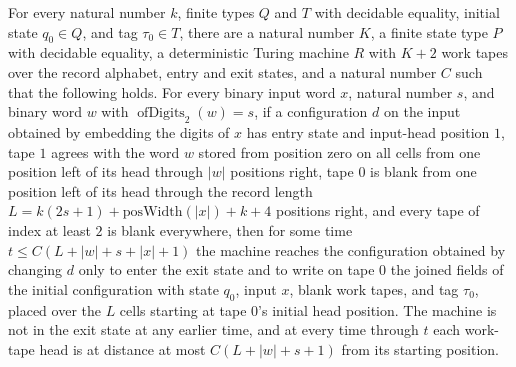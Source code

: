 \begin{theorem}
\label{Turing.exists_recordInitTM}
\leanok
{}
For every natural number $k$, finite types $Q$ and $T$ with decidable equality, initial
state $q_0\in Q$, and tag $\tau_0\in T$, there are a natural number $K$, a finite state
type $P$ with decidable equality, a deterministic Turing machine $R$ with $K+2$ work
tapes over the record alphabet, entry and exit states, and a natural number $C$ such
that the following holds. For every binary input word $x$, natural number $s$, and
binary word $w$ with $\operatorname{ofDigits}_2(w)=s$, if a configuration $d$ on the
input obtained by embedding the digits of $x$ has entry state and input-head position
$1$, tape $1$ agrees with the word $w$ stored from position zero on all cells from one
position left of its head through $|w|$ positions right, tape $0$ is blank from one
position left of its head through the record length
$L=k(2s+1)+\mathrm{posWidth}(|x|)+k+4$ positions right, and every tape of index at least
$2$ is blank everywhere, then for some time $t\le C(L+|w|+s+|x|+1)$ the machine reaches
the configuration obtained by changing $d$ only to enter the exit state and to write on
tape $0$ the joined fields of the initial configuration with state $q_0$, input $x$,
blank work tapes, and tag $\tau_0$, placed over the $L$ cells starting at tape $0$'s
initial head position. The machine is not in the exit state at any earlier time, and at
every time through $t$ each work-tape head is at distance at most $C(L+|w|+s+1)$ from
its starting position.
\end{theorem}

